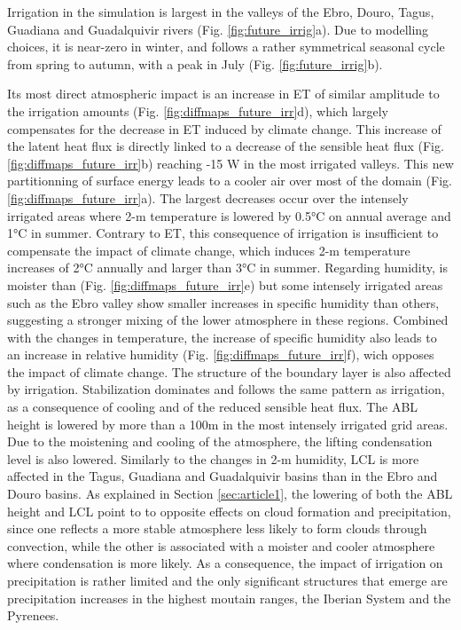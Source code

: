 Irrigation in the \futirr simulation is largest in the valleys of the Ebro, Douro, Tagus, Guadiana and Guadalquivir rivers (Fig. \ref{fig:future_irrig}a). Due to modelling choices, it is near-zero in winter, and follows a rather symmetrical seasonal cycle from spring to autumn, with a peak in July (Fig. \ref{fig:future_irrig}b).

Its most direct atmospheric impact is an increase in ET of similar amplitude to the irrigation amounts (Fig. \ref{fig:diffmaps_future_irr}d), which largely compensates for the decrease in ET induced by climate change. This increase of the latent heat flux is directly linked to a decrease of the sensible heat flux (Fig. \ref{fig:diffmaps_future_irr}b) reaching -15 W \persqm in the most irrigated valleys. 
This new partitionning of surface energy leads to a cooler air over most of the domain (Fig. \ref{fig:diffmaps_future_irr}a). The largest decreases occur  over the intensely irrigated areas where 2-m temperature is lowered by 0.5°C on annual average and 1°C in summer. %
Contrary to ET, this consequence of irrigation is insufficient to compensate the impact of climate change, which induces 2-m temperature increases of 2°C annually and larger than 3°C in summer. %
Regarding humidity, \futirr is moister than \futnoirr (Fig. \ref{fig:diffmaps_future_irr}e) but some intensely irrigated areas such as the Ebro valley show smaller increases in specific humidity than others, suggesting a stronger mixing of the lower atmosphere in these regions. Combined with the changes in temperature, the increase of specific humidity also leads to an increase in relative humidity  (Fig. \ref{fig:diffmaps_future_irr}f), wich opposes the impact of climate change.
The structure of the boundary layer is also affected by irrigation. Stabilization dominates and follows the same pattern as irrigation, as a consequence of cooling and of the reduced sensible heat flux. The ABL height is lowered by more than a 100m in the most intensely irrigated grid areas. 
Due to the moistening and cooling of the atmosphere, the lifting condensation level is also lowered. Similarly to the changes in 2-m humidity, LCL is more affected in the Tagus, Guadiana and Guadalquivir basins than in the Ebro and Douro basins.
As explained in Section \ref{sec:article1}, the lowering of both the ABL height and LCL point to to opposite effects on cloud formation and precipitation, since one reflects a more stable atmosphere less likely to form clouds through convection, while the other is associated with a moister and cooler atmosphere where condensation is more likely. As a consequence, the impact of irrigation on precipitation is rather limited and the only significant structures that emerge are precipitation increases in the highest moutain ranges, the Iberian System and the Pyrenees.

